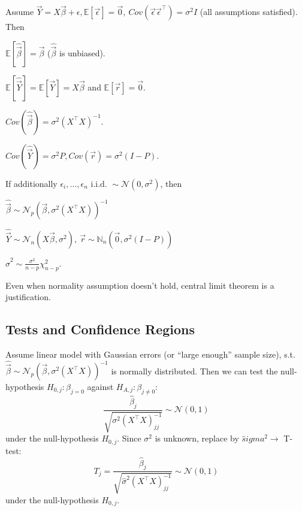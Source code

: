 \begin{notebox}\nospacing{}
  Assume $\vec{Y}=X\vec{\beta} + \epsilon, \mathbb{E}[\vec{\epsilon}]=\vec{0},\ Cov(\vec{\epsilon} \vec{\epsilon}^{\top}) = \sigma^{2}I$ (all assumptions satisfied). Then
  \begin{enumeratenosep}[label=\roman*]
    \item $\mathbb{E}[\hat{\vec{\beta}}] = \vec{\beta}$ ($\hat{\vec{\beta}}$ is unbiased).
    \item $\mathbb{E}[\hat{\vec{Y}}] = \mathbb{E}[\vec{Y}] = X\vec{\beta}$ and $\mathbb{E}[\vec{r}] = \vec{0}$.
    \item $Cov(\hat{\vec{\beta}}) = \sigma^{2}{(X^{\top}X)}^{-1}$.
    \item $Cov(\hat{\vec{Y}}) = \sigma^{2} P, Cov(\vec{r}) = \sigma^{2}(I-P)$.
  \end{enumeratenosep}
  If additionally $\epsilon_{i}, \dots, \epsilon_{n} \text{ i.i.d. } \sim \mathcal{N}(0, \sigma^{2})$, then
  \begin{enumeratenosep}[label=\roman*]
    \item $\hat{\vec{\beta}} \sim \mathcal{N}_{p}{(\vec{\beta}, \sigma^{2}(X^{\top}X))}^{-1}$
    \item $\hat{\vec{Y}} \sim \mathcal{N}_{n}(X\vec{\beta}, \sigma^{2}),\ \vec{r} \sim \mathbb{N}_{n}(\vec{0}, \sigma^{2}(I-P))$
    \item $\hat \sigma^{2} \sim \frac{\sigma^{2}}{n-p}\chi^{2}_{n-p}$.
  \end{enumeratenosep}
  Even when normality assumption doesn't hold, central limit theorem is a justification.
\end{notebox}
\subsection{Tests and Confidence Regions}\label{subsec:tests_and_confidence_regions}
\begin{sectionbox}[T-test]\nospacing{}
  Assume linear model with Gaussian errors (or ``large enough'' sample size), s.t. $\hat{\vec{\beta}} \sim \mathcal{N}_{p}{(\vec{\beta}, \sigma^{2}(X^{\top}X))}^{-1}$ is normally distributed.
  Then we can test the null-hypothesis $H_{0,j}: \beta_{j = 0}$ against $H_{A,j}: \beta_{j \neq 0}$:
  \[\frac{\hat \beta_{j}}{\sqrt{\sigma^{2}{{(X^{\top}X)}^{-1}_{jj}}}} \sim \mathcal{N}(0,1)\] under the null-hypothesis $H_{0,j}$. Since $\sigma^{2}$ is unknown, replace by $\hat sigma^{2} \rightarrow$ T-test:
  \[T_{j} = \frac{\hat \beta_{j}}{\sqrt{\hat \sigma^{2}{{(X^{\top}X)}^{-1}_{jj}}}} \sim \mathcal{N}(0,1)\] under the null-hypothesis $H_{0,j}$.
\end{sectionbox}


